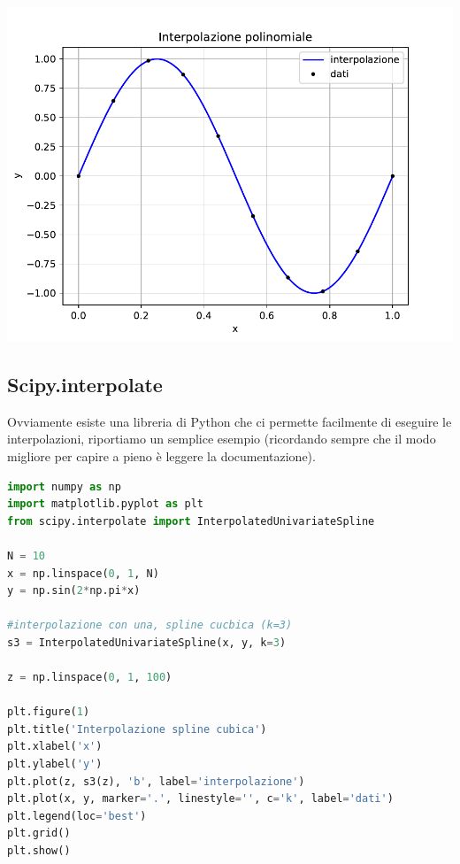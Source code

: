 \documentclass[10pt,a4paper]{article}
\begin{document}
\begin{center}
\includegraphics[scale=0.8]{img/int_pol.pdf}    
\end{center}

\subsection{Scipy.interpolate}
Ovviamente esiste una libreria di Python che ci permette facilmente di eseguire le interpolazioni, riportiamo un semplice esempio (ricordando sempre che il modo migliore per capire a pieno è leggere la documentazione).


\begin{lstlisting}[language=Python]
import numpy as np
import matplotlib.pyplot as plt
from scipy.interpolate import InterpolatedUnivariateSpline

N = 10
x = np.linspace(0, 1, N)
y = np.sin(2*np.pi*x)

#interpolazione con una, spline cucbica (k=3)
s3 = InterpolatedUnivariateSpline(x, y, k=3)

z = np.linspace(0, 1, 100)

plt.figure(1)
plt.title('Interpolazione spline cubica')
plt.xlabel('x')
plt.ylabel('y')
plt.plot(z, s3(z), 'b', label='interpolazione')
plt.plot(x, y, marker='.', linestyle='', c='k', label='dati')
plt.legend(loc='best')
plt.grid()
plt.show()
\end{lstlisting}
\end{document}
